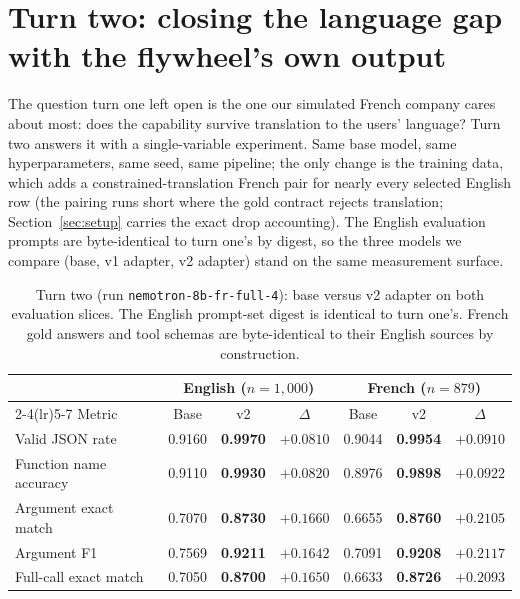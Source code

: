 \documentclass{article}
\begin{document}
\section{Turn two: closing the language gap with the flywheel's own output}
\label{sec:turn2}

The question turn one left open is the one our simulated French company cares about most: does the capability survive translation to the users' language? Turn two answers it with a single-variable experiment. Same base model, same hyperparameters, same seed, same pipeline; the only change is the training data, which adds a constrained-translation French pair for nearly every selected English row (the pairing runs short where the gold contract rejects translation; Section~\ref{sec:setup} carries the exact drop accounting). The English evaluation prompts are byte-identical to turn one's by digest, so the three models we compare (base, v1 adapter, v2 adapter) stand on the same measurement surface.

\begin{table}[t]
  \caption{Turn two (run \texttt{nemotron-8b-fr-full-4}): base versus v2 adapter on both evaluation slices. The English prompt-set digest is identical to turn one's. French gold answers and tool schemas are byte-identical to their English sources by construction.}
  \label{tab:v2}
  \centering
  \small
  \begin{tabular}{lcccccc}
    \toprule
    & \multicolumn{3}{c}{English ($n{=}1{,}000$)} & \multicolumn{3}{c}{French ($n{=}879$)} \\
    \cmidrule(lr){2-4}\cmidrule(lr){5-7}
    Metric & Base & v2 & $\Delta$ & Base & v2 & $\Delta$ \\
    \midrule
    Valid JSON rate & 0.9160 & \textbf{0.9970} & $+0.0810$ & 0.9044 & \textbf{0.9954} & $+0.0910$ \\
    Function name accuracy & 0.9110 & \textbf{0.9930} & $+0.0820$ & 0.8976 & \textbf{0.9898} & $+0.0922$ \\
    Argument exact match & 0.7070 & \textbf{0.8730} & $+0.1660$ & 0.6655 & \textbf{0.8760} & $+0.2105$ \\
    Argument F1 & 0.7569 & \textbf{0.9211} & $+0.1642$ & 0.7091 & \textbf{0.9208} & $+0.2117$ \\
    Full-call exact match & 0.7050 & \textbf{0.8700} & $+0.1650$ & 0.6633 & \textbf{0.8726} & $+0.2093$ \\
    \bottomrule
  \end{tabular}
\end{table}
\end{document}
